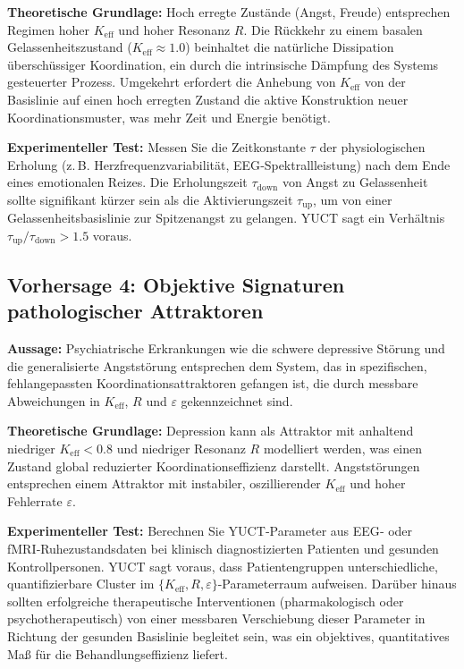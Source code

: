 \documentclass[12pt,a4paper]{article}
\begin{document}
	\textbf{Theoretische Grundlage:} Hoch erregte Zustände (Angst, Freude) entsprechen Regimen hoher \(K_{\mathrm{eff}}\) und hoher Resonanz \(R\). Die Rückkehr zu einem basalen Gelassenheitszustand (\(K_{\mathrm{eff}} \approx 1.0\)) beinhaltet die natürliche Dissipation überschüssiger Koordination, ein durch die intrinsische Dämpfung des Systems gesteuerter Prozess. Umgekehrt erfordert die Anhebung von \(K_{\mathrm{eff}}\) von der Basislinie auf einen hoch erregten Zustand die aktive Konstruktion neuer Koordinationsmuster, was mehr Zeit und Energie benötigt.
	
	\textbf{Experimenteller Test:} Messen Sie die Zeitkonstante \(\tau\) der physiologischen Erholung (z. B. Herzfrequenzvariabilität, EEG‑Spektrallleistung) nach dem Ende eines emotionalen Reizes. Die Erholungszeit \(\tau_{\text{down}}\) von Angst zu Gelassenheit sollte signifikant kürzer sein als die Aktivierungszeit \(\tau_{\text{up}}\), um von einer Gelassenheitsbasislinie zur Spitzenangst zu gelangen. YUCT sagt ein Verhältnis \(\tau_{\text{up}}/\tau_{\text{down}} > 1.5\) voraus.
	
	\subsection{Vorhersage 4: Objektive Signaturen pathologischer Attraktoren}
	
	\textbf{Aussage:} Psychiatrische Erkrankungen wie die schwere depressive Störung und die generalisierte Angststörung entsprechen dem System, das in spezifischen, fehlangepassten Koordinationsattraktoren gefangen ist, die durch messbare Abweichungen in \(K_{\mathrm{eff}}\), \(R\) und \(\varepsilon\) gekennzeichnet sind.
	
	\textbf{Theoretische Grundlage:} Depression kann als Attraktor mit anhaltend niedriger \(K_{\mathrm{eff}} < 0.8\) und niedriger Resonanz \(R\) modelliert werden, was einen Zustand global reduzierter Koordinationseffizienz darstellt. Angststörungen entsprechen einem Attraktor mit instabiler, oszillierender \(K_{\mathrm{eff}}\) und hoher Fehlerrate \(\varepsilon\).
	
	\textbf{Experimenteller Test:} Berechnen Sie YUCT‑Parameter aus EEG‑ oder fMRI‑Ruhezustandsdaten bei klinisch diagnostizierten Patienten und gesunden Kontrollpersonen. YUCT sagt voraus, dass Patientengruppen unterschiedliche, quantifizierbare Cluster im \(\{K_{\mathrm{eff}}, R, \varepsilon\}\)-Parameterraum aufweisen. Darüber hinaus sollten erfolgreiche therapeutische Interventionen (pharmakologisch oder psychotherapeutisch) von einer messbaren Verschiebung dieser Parameter in Richtung der gesunden Basislinie begleitet sein, was ein objektives, quantitatives Maß für die Behandlungseffizienz liefert.
	
\end{document}
